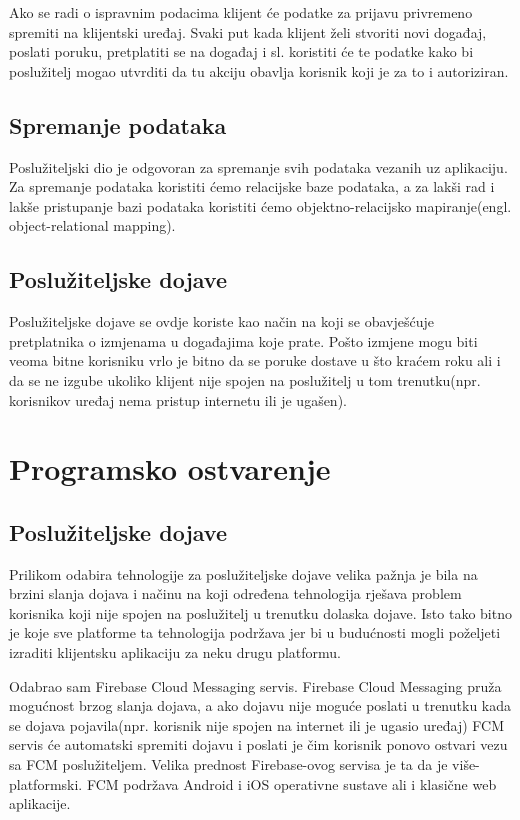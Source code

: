 \documentclass[times, utf8, zavrsni]{fer}
\begin{document}
Ako se radi o ispravnim podacima klijent će podatke za prijavu privremeno spremiti na klijentski uređaj. Svaki put kada klijent želi stvoriti novi događaj, poslati poruku, pretplatiti se na događaj i sl. koristiti će te podatke kako bi poslužitelj mogao utvrditi da tu akciju obavlja korisnik koji je za to i autoriziran.

\section{Spremanje podataka}
Poslužiteljski dio je odgovoran za spremanje svih podataka vezanih uz aplikaciju. Za spremanje podataka koristiti ćemo relacijske baze podataka, a za lakši rad i lakše pristupanje bazi podataka koristiti ćemo objektno-relacijsko mapiranje(engl. object-relational mapping).

\section{Poslužiteljske dojave}
Poslužiteljske dojave se ovdje koriste kao način na koji se obavješćuje pretplatnika o izmjenama u događajima koje prate. Pošto izmjene mogu biti veoma bitne korisniku vrlo je bitno da se poruke dostave u što kraćem roku ali i da se ne izgube ukoliko klijent nije spojen na poslužitelj u tom trenutku(npr. korisnikov uređaj nema pristup internetu ili je ugašen).

\chapter{Programsko ostvarenje}
\label{chp:implementation}

\section{Poslužiteljske dojave}
Prilikom odabira tehnologije za poslužiteljske dojave velika pažnja je bila na brzini slanja dojava i načinu na koji određena tehnologija rješava problem korisnika koji nije spojen na poslužitelj u trenutku dolaska dojave. Isto tako bitno je koje sve platforme ta tehnologija podržava jer bi u budućnosti mogli poželjeti izraditi klijentsku aplikaciju za neku drugu platformu.

Odabrao sam Firebase Cloud Messaging servis. Firebase Cloud Messaging pruža mogućnost brzog slanja dojava, a ako dojavu nije moguće poslati u trenutku kada se dojava pojavila(npr. korisnik nije spojen na internet ili je ugasio uređaj) FCM servis će automatski spremiti dojavu i poslati je čim korisnik ponovo ostvari vezu sa FCM poslužiteljem. Velika prednost Firebase-ovog servisa je ta da je više-platformski. FCM podržava Android i iOS operativne sustave ali i klasične web aplikacije.
\end{document}
